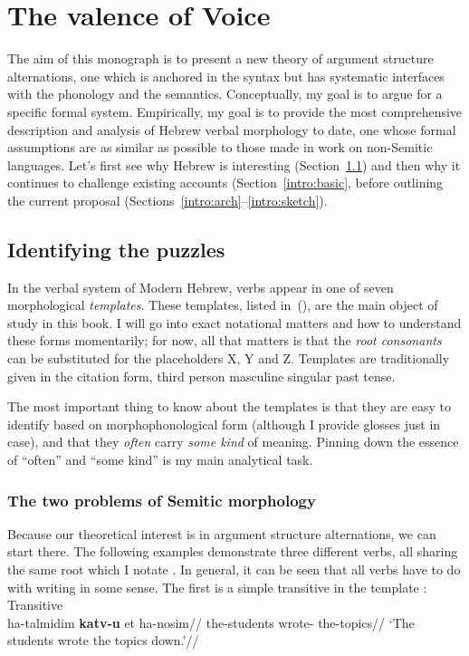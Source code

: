 \chapter{The valence of Voice}
\label{chap:intro}

The aim of this monograph is to present a new theory of argument structure alternations, one which is anchored in the syntax but has systematic interfaces with the phonology and the semantics. Conceptually, my goal is to argue for a specific formal system. Empirically, my goal is to provide the most comprehensive description and analysis of Hebrew verbal morphology to date, one whose formal assumptions are as similar as possible to those made in work on non-Semitic languages. Let's first see why Hebrew is interesting (Section~\ref{intro:puzzles}) and then why it continues to challenge existing accounts (Section~\ref{intro:basic}, before outlining the current proposal (Sections~\ref{intro:arch}--\ref{intro:sketch}).

\section{Identifying the puzzles} \label{intro:puzzles}
In the verbal system of Modern Hebrew, verbs appear in one of seven morphological \emph{templates}. These templates, listed in~(\nextx), are the main object of study in this book. I will go into exact notational matters and how to understand these forms momentarily; for now, all that matters is that the \emph{root consonants} can be substituted for the placeholders X, Y and Z. Templates are traditionally given in the citation form, third person masculine singular past tense.
\pex
	\a {\tkal}
	\a {\tnif}
	\a {\tpie}
	\a {\thit}
	\a {\thif}
	\a {\tpua}
	\a {\thuf}
\xe

The most important thing to know about the templates is that they are easy to identify based on morphophonological form (although I provide glosses just in case), and that they \emph{often} carry \emph{some kind} of meaning. Pinning down the essence of ``often'' and ``some kind'' is my main analytical task.

	\subsection{The two problems of Semitic morphology}
Because our theoretical interest is in argument structure alternations, we can start there. The following examples demonstrate three different verbs, all sharing the same root which I notate . In general, it can be seen that all verbs have to do with writing in some sense. The first is a simple transitive in the template {\tkal}:
\ex	\label{ex:intro-tkal}Transitive {\tkal}\\
		\begingl
		\gla ha-talmidim \textbf{katv-u} et ha-nosim//
		\glb the-students wrote-  the-topics//
		\glft `The students wrote the topics down.'//
	\endgl
\xe

